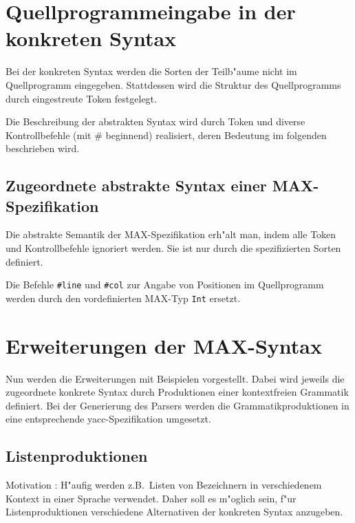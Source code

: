 
\section{Quellprogrammeingabe in der konkreten Syntax}
\label{konkrsyn}

Bei der konkreten Syntax werden die Sorten der Teilb"aume nicht im
Quellprogramm eingegeben. Stattdessen wird die Struktur des Quellprogramms
durch eingestreute Token festgelegt.

Die Beschreibung der abstrakten Syntax wird durch Token und diverse
Kontrollbefehle (mit \# beginnend) realisiert, deren Bedeutung
im folgenden beschrieben wird.


\subsection{Zugeordnete abstrakte Syntax einer MAX-Spezifikation}

Die abstrakte Semantik der MAX-Spezifikation erh"alt man, indem
alle Token und Kontrollbefehle ignoriert werden. Sie ist nur durch die
spezifizierten Sorten definiert.

\medskip{}

\noindent
Die Befehle {\tt \#line} und {\tt \#col} zur Angabe von Positionen im
Quellprogramm werden durch den vordefinierten MAX-Typ {\tt Int} ersetzt.



\section{Erweiterungen der MAX-Syntax}


Nun werden die Erweiterungen mit Beispielen vorgestellt. Dabei wird
jeweils die zugeordnete konkrete Syntax durch Produktionen einer
kontextfreien Grammatik definiert. Bei der Generierung des Parsers
werden die Grammatikproduktionen in eine entsprechende
yacc-Spezifikation umgesetzt.


\subsection{Listenproduktionen}

Motivation :
H"aufig werden z.B.\ Listen von Bezeichnern in verschiedenem Kontext
in einer Sprache verwendet. Daher soll es m"oglich sein, f"ur
Listenproduktionen verschiedene Alternativen der konkreten Syntax
anzugeben.

